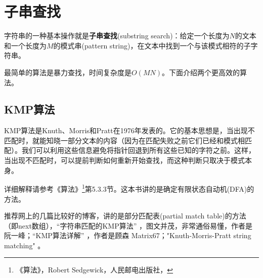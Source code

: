 \section{子串查找} %
\label{sec:substring-search}

字符串的一种基本操作就是\textbf{子串查找}(substring search)：给定一个长度为$N$的文本和一个长度为$M$的模式串(pattern string)，在文本中找到一个与该模式相符的子字符串。

最简单的算法是暴力查找，时间复杂度是$O(MN)$。下面介绍两个更高效的算法。


\subsection{KMP算法}
KMP算法是Knuth、Morris和Pratt在1976年发表的。它的基本思想是，当出现不匹配时，就能知晓一部分文本的内容（因为在匹配失败之前它们已经和模式相匹配）。我们可以利用这些信息避免将指针回退到所有这些已知的字符之前。这样，当出现不匹配时，可以提前判断如何重新开始查找，而这种判断只取决于模式本身。

详细解释请参考《算法》\footnote{《算法》，Robert Sedgewick，人民邮电出版社，}第5.3.3节。这本书讲的是确定有限状态自动机(DFA)的方法。

推荐网上的几篇比较好的博客，讲的是部分匹配表(partial match table)的方法（即next数组），“字符串匹配的KMP算法” ，图文并茂，非常通俗易懂，作者是阮一峰；“KMP算法详解” ，作者是顾森 Matrix67；"Knuth-Morris-Pratt string matching" 。

